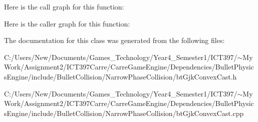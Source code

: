Here is the call graph for this function:

Here is the caller graph for this function:

The documentation for this class was generated from the following files:\begin{CompactItemize}
\item 
C:/Users/New/Documents/Games\_\-Technology/Year4\_\-Semester1/ICT397/$\sim$My Work/Assignment2/ICT397Carre/CarreGameEngine/Dependencies/BulletPhysicsEngine/include/BulletCollision/NarrowPhaseCollision/btGjkConvexCast.h\item 
C:/Users/New/Documents/Games\_\-Technology/Year4\_\-Semester1/ICT397/$\sim$My Work/Assignment2/ICT397Carre/CarreGameEngine/Dependencies/BulletPhysicsEngine/include/BulletCollision/NarrowPhaseCollision/btGjkConvexCast.cpp\end{CompactItemize}
